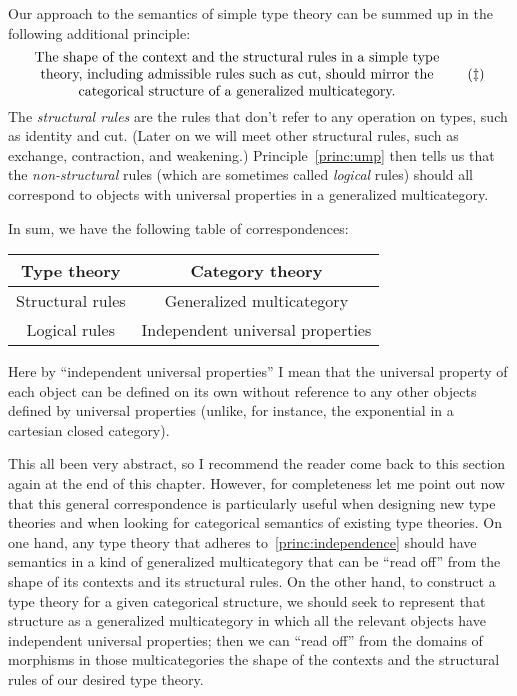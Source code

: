 \documentclass{book}
\begin{document}
Our approach to the semantics of simple type theory can be summed up in the following additional principle:
\begin{equation}\label{princ:structural}
  \parbox{4in}{\centering The shape of the context and the structural rules in a simple type theory, including admissible rules such as cut, should mirror the categorical structure of a generalized multicategory.}\tag{$\ddagger$}
\end{equation}
The \emph{structural rules} are the rules that don't refer to any operation on types, such as identity and cut.
(Later on we will meet other structural rules, such as exchange, contraction, and weakening.)
Principle~\eqref{princ:ump} then tells us that the \emph{non-structural} rules (which are sometimes called \emph{logical} rules) should all correspond to objects with universal properties in a generalized multicategory.

In sum, we have the following table of correspondences:
\begin{center}
  \begin{tabular}{c|c}
    Type theory & Category theory\\\hline
    Structural rules & Generalized multicategory\\
    Logical rules & Independent universal properties
  \end{tabular}
\end{center}
Here by ``independent universal properties'' I mean that the universal property of each object can be defined on its own without reference to any other objects defined by universal properties (unlike, for instance, the exponential in a cartesian closed category).

This all been very abstract, so I recommend the reader come back to this section again at the end of this chapter.
However, for completeness let me point out now that this general correspondence is particularly useful when designing new type theories and when looking for categorical semantics of existing type theories.
On one hand, any type theory that adheres to~\eqref{princ:independence} should have semantics in a kind of generalized multicategory that can be ``read off'' from the shape of its contexts and its structural rules.
On the other hand, to construct a type theory for a given categorical structure, we should seek to represent that structure as a generalized multicategory in which all the relevant objects have independent universal properties; then we can ``read off'' from the domains of morphisms in those multicategories the shape of the contexts and the structural rules of our desired type theory.
\end{document}
